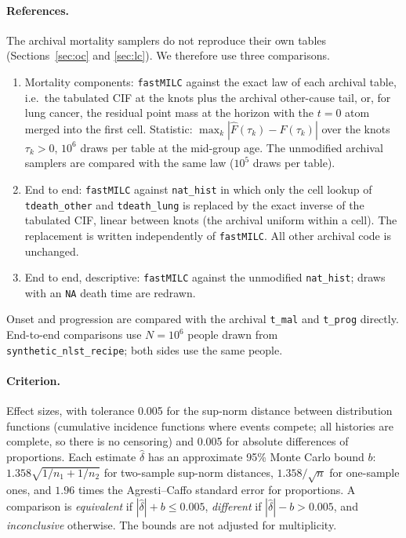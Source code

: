 \documentclass[11pt]{article}
\newcommand{\code}[1]{\texttt{#1}}
\begin{document}
\paragraph{References.} The archival mortality samplers do not reproduce their
own tables (Sections~\ref{sec:oc} and \ref{sec:lc}). We therefore use three
comparisons.
\begin{enumerate}[nosep]
\item[A.] Mortality components: \code{fastMILC} against the exact law of each
  archival table, i.e.\ the tabulated CIF at the knots plus the archival
  other-cause tail, or, for lung cancer, the residual point mass at the horizon
  with the $t = 0$ atom merged into the first cell. Statistic:
  $\max_k |\hat F(\tau_k) - F(\tau_k)|$ over the knots $\tau_k > 0$,
  $10^6$ draws per table at the mid-group age. The unmodified archival samplers
  are compared with the same law ($10^5$ draws per table).
\item[B.] End to end: \code{fastMILC} against \code{nat\_hist} in which only
  the cell lookup of \code{tdeath\_other} and \code{tdeath\_lung} is replaced
  by the exact inverse of the tabulated CIF, linear between knots (the
  archival uniform within a cell). The replacement is written independently of
  \code{fastMILC}. All other archival code is unchanged.
\item[C.] End to end, descriptive: \code{fastMILC} against the unmodified
  \code{nat\_hist}; draws with an \code{NA} death time are redrawn.
\end{enumerate}
Onset and progression are compared with the archival \code{t\_mal} and
\code{t\_prog} directly. End-to-end comparisons use $N = 10^6$ people drawn
from \code{synthetic\_nlst\_recipe}; both sides use the same people.

\paragraph{Criterion.} Effect sizes, with tolerance 0.005 for the sup-norm
distance between distribution functions (cumulative incidence functions where
events compete; all histories are complete, so there is no censoring) and 0.005
for absolute differences of proportions. Each estimate $\hat\delta$ has an
approximate 95\% Monte Carlo bound $b$: $1.358\sqrt{1/n_1+1/n_2}$ for two-sample
sup-norm distances, $1.358/\sqrt n$ for one-sample ones, and $1.96$ times the
Agresti--Caffo standard error for proportions. A comparison is
\emph{equivalent} if $|\hat\delta| + b \le 0.005$, \emph{different} if
$|\hat\delta| - b > 0.005$, and \emph{inconclusive} otherwise. The bounds are
not adjusted for multiplicity.
\end{document}

